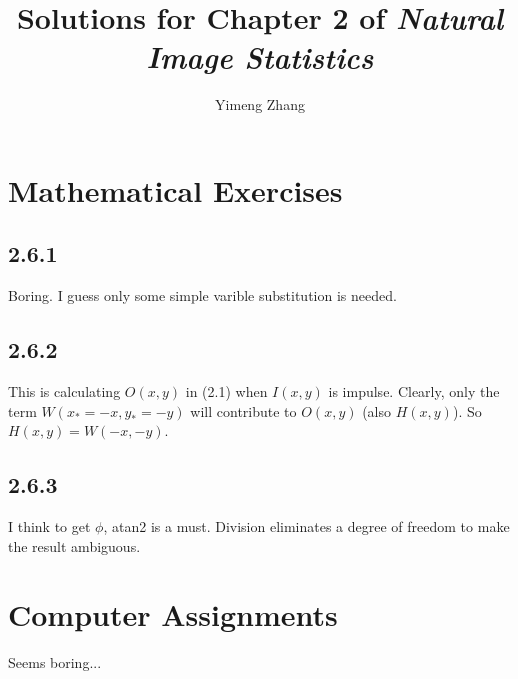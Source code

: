 \documentclass[12pt]{article}
\title{Solutions for Chapter 2 of \emph{Natural Image Statistics}}
\author{Yimeng Zhang}
\begin{document}
\maketitle





\section{Mathematical Exercises} %
\label{sec:mathematical_exercises}

\subsection{2.6.1} %
\label{sub:2_6_1}
Boring. I guess only some simple varible substitution is needed.

\subsection{2.6.2} %
\label{sub:2_6_2}
This is calculating $O(x,y)$ in (2.1) when $I(x,y)$ is impulse. Clearly, only the term $W(x_* = -x, y_* = -y)$ will contribute to $O(x,y)$ (also $H(x,y)$). So $H(x,y)= W(-x,-y)$.

\subsection{2.6.3} %
\label{sub:2_6_3}
I think to get $\phi$, atan2 is a must. Division eliminates a degree of freedom to make the result ambiguous.

\section{Computer Assignments} %
\label{sec:computer_assignments}
Seems boring...
\end{document}
